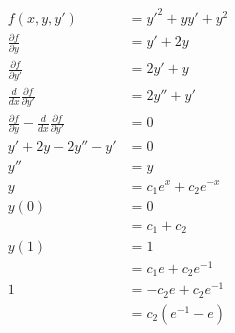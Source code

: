 \documentclass{article}
\begin{document}
\setcounter{subsection}{8}
\subsection{}

\begin{align*}
  f(x, y, y')                                                                  & = y'^2 + y y' + y^2                                  \\
  \frac{\partial f}{\partial y}                                                & = y' + 2 y                                           \\
  \frac{\partial f}{\partial y'}                                               & = 2 y' + y                                           \\
  \frac{d}{d x} \frac{\partial f}{\partial y'}                                 & = 2 y'' + y'                                         \\
  \frac{\partial f}{\partial y} - \frac{d}{d x} \frac{\partial f}{\partial y'} & = 0                                                  \\
  y' + 2 y - 2 y'' - y'                                                        & = 0                                                  \\
  y''                                                                          & = y                                                  \\
  y                                                                            & = c_1 e^x + c_2 e^{-x}                               \\
  y(0)                                                                         & = 0                                                  \\
                                                                               & = c_1 + c_2                                          \\
  y(1)                                                                         & = 1                                                  \\
                                                                               & = c_1 e + c_2 e^{-1}                                 \\
  1                                                                            & = -c_2 e + c_2 e^{-1}                                \\
                                                                               & = c_2 (e^{-1} - e)                                   \\

\end{align*}
\end{document}
